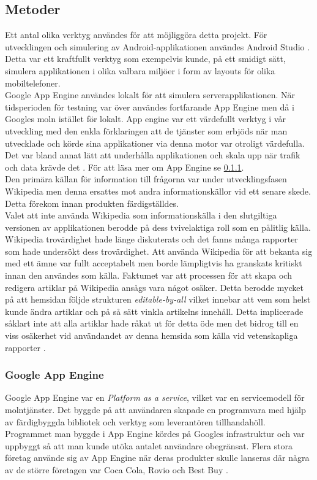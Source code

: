 \documentclass[a4paper, 11pt]{article}
\begin{document}
\subsection{Metoder}
Ett antal olika verktyg användes för att möjliggöra detta projekt. För utvecklingen och simulering av Android-applikationen användes Android Studio \cite{androidstudio}. Detta var ett kraftfullt verktyg som exempelvis kunde, på ett smidigt sätt, simulera applikationen i olika valbara miljöer i form av layouts för olika mobiltelefoner.\\
Google App Engine användes lokalt för att simulera serverapplikationen. När tidsperioden för testning var över användes fortfarande App Engine men då i Googles moln istället för lokalt. App engine var ett värdefullt verktyg i vår utveckling med den enkla förklaringen att de tjänster som erbjöds när man utvecklade och körde sina applikationer via denna motor var otroligt värdefulla. Det var bland annat lätt att underhålla applikationen och skala upp när trafik och data krävde det \cite{googleappengine}. För att läsa mer om App Engine se \ref{Google App Engine}. \\
Den primära källan för information till frågorna var under utvecklingsfasen Wikipedia men denna ersattes mot andra informationskällor vid ett senare skede. Detta förekom innan produkten färdigställdes.\\ 
Valet att inte använda Wikipedia som informationskälla i den slutgiltiga versionen av applikationen berodde på dess tvivelaktiga roll som en pålitlig källa. Wikipedia trovärdighet hade länge diskuterats och det fanns många rapporter som hade undersökt dess trovärdighet. Att använda Wikipedia för att bekanta sig med ett ämne var fullt acceptabelt men borde lämpligtvis ha granskats kritiskt innan den användes som källa. Faktumet var att processen för att skapa och redigera artiklar på Wikipedia ansågs vara något osäker. Detta berodde mycket på att hemsidan följde strukturen \textit{editable-by-all} vilket innebar att vem som helst kunde ändra artiklar och på så sätt vinkla artikelns innehåll. Detta implicerade såklart inte att alla artiklar hade råkat ut för detta öde men det bidrog till en viss osäkerhet vid användandet av denna hemsida som källa vid vetenskapliga rapporter \cite{wikipediacred}.

\subsubsection{Google App Engine} \label{Google App Engine}
Google App Engine var en \textit{Platform as a service}, vilket var en servicemodell för molntjänster. Det byggde på att användaren skapade en programvara med hjälp av färdigbyggda bibliotek och verktyg som leverantören tillhandahöll. Programmet man byggde i App Engine kördes på Googles infrastruktur och var uppbyggt så att man kunde utöka antalet användare obegränsat. Flera stora företag använde sig av App Engine när deras produkter skulle lanseras där några av de större företagen var Coca Cola, Rovio och Best Buy \cite{googleappenginecustomers}. 
\end{document}
